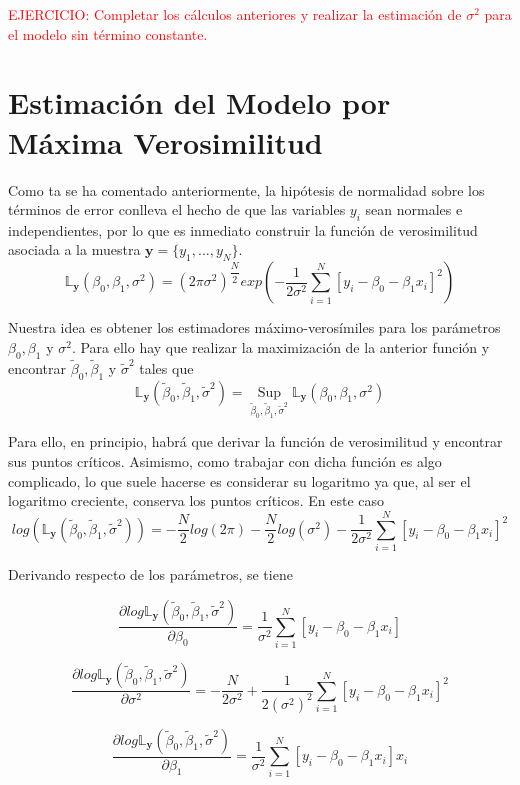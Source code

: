 \documentclass[10pt,a4paper]{book}
\begin{document}
\textcolor{red}{EJERCICIO: Completar los cálculos anteriores y realizar la estimación de $\sigma^2$ para el modelo sin término constante.}
	\section{Estimación del Modelo por Máxima Verosimilitud}
Como ta se ha comentado anteriormente, la hipótesis de normalidad sobre los términos de error conlleva el hecho de que las variables $y_i$ sean normales e independientes, por lo que es inmediato construir la función de verosimilitud asociada a la muestra $\mathbf{y}=\{y_1,...,y_N\}$.
$$\mathbb{L}_\mathbf{y}(\beta_0,\beta_1,\sigma^2)=(2\pi\sigma^2)^{\dfrac{N}{2}}exp\left(-\dfrac{1}{2\sigma^2}\sum^N_{i=1}[y_i-\beta_0-\beta_1x_i]^2\right)$$

Nuestra idea es obtener los estimadores máximo-verosímiles para los parámetros $\beta_0,\beta_1$ y $\sigma^2$. Para ello hay que realizar la maximización de la anterior función y encontrar $\tilde{\beta}_0,\tilde{\beta}_1$ y $\tilde{\sigma}^2$ tales que $$\mathbb{L}_\mathbf{y}(\tilde{\beta}_0,\tilde{\beta}_1,\tilde{\sigma}^2)=\operatorname*{Sup}\limits_{\tilde{\beta}_0,\tilde{\beta}_1,\tilde{\sigma}^2}\mathbb{L}_\mathbf{y}(\beta_0,\beta_1,\sigma^2)$$

Para ello, en principio, habrá que derivar la función de verosimilitud y encontrar sus puntos críticos. Asimismo, como trabajar con dicha función es algo complicado, lo que suele hacerse es considerar su logaritmo ya que, al ser el logaritmo creciente, conserva los puntos críticos. En este caso $$log(\mathbb{L}_\mathbf{y}(\tilde{\beta}_0,\tilde{\beta}_1,\tilde{\sigma}^2))=-\dfrac{N}{2}log(2\pi)-\dfrac{N}{2}log(\sigma^2)-\dfrac{1}{2\sigma^2}\sum^N_{i=1}[y_i-\beta_0-\beta_1x_i]^2$$

Derivando respecto de los parámetros, se tiene \begin{multicols}{2}
\begin{equation*}
\dfrac{\partial log\mathbb{L}_\mathbf{y}(\tilde{\beta}_0,\tilde{\beta}_1,\tilde{\sigma}^2)}{\partial\beta_0}=\dfrac{1}{\sigma^2}\sum^N_{i=1}[y_i-\beta_0-\beta_1x_i]
\end{equation*}

\begin{equation*}
\dfrac{\partial log\mathbb{L}_\mathbf{y}(\tilde{\beta}_0,\tilde{\beta}_1,\tilde{\sigma}^2)}{\partial\sigma^2}=-\dfrac{N}{2\sigma^2}+\dfrac{1}{2(\sigma^2)^2}\sum^N_{i=1}[y_i-\beta_0-\beta_1x_i]^2
\end{equation*}

\begin{equation*}
\dfrac{\partial log\mathbb{L}_\mathbf{y}(\tilde{\beta}_0,\tilde{\beta}_1,\tilde{\sigma}^2)}{\partial\beta_1}=\dfrac{1}{\sigma^2}\sum^N_{i=1}[y_i-\beta_0-\beta_1x_i]x_i
\end{equation*}
\end{multicols}
\end{document}
